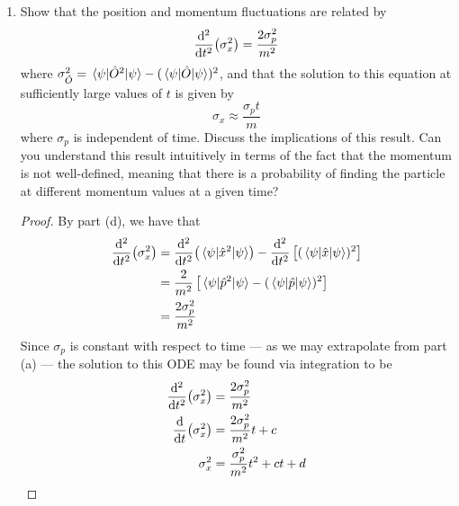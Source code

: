 \documentclass[../psets.tex]{subfiles}
\begin{document}
\begin{enumerate}
\begin{enumerate}
\begin{proof}
\begin{align*}
                &= 2\dv{t}(\ev{\hat{x}}{\psi})\cdot\dv{t}(\ev{\hat{x}}{\psi})+2\ev{\hat{x}}{\psi}\cdot\dv[2]{t}(\ev{\hat{x}}{\psi})\\
                &= \frac{2p_0^2}{m^2}+2x_0\cdot\underbrace{\dv{t}(\frac{p_0}{m})}_0\\
                \Aboxed{\dv[2]{t}\left[ (\ev{\hat{x}}{\psi})^2 \right] &= \frac{2}{m^2}(\ev{\hat{p}}{\psi})^2}
            \end{align*}
        \end{proof}
        \item Show that the position and momentum fluctuations are related by
        \begin{equation}
            \dv[2]{t}(\sigma_x^2) = \frac{2\sigma_p^2}{m^2}
        \end{equation}
        where $\sigma_{\hat{O}}^2=\ev{\hat{O}^2}{\psi}-(\ev{\hat{O}}{\psi})^2$, and that the solution to this equation at sufficiently large values of $t$ is given by
        \begin{equation}\label{eqn:4.6}
            \sigma_x \approx \frac{\sigma_pt}{m}
        \end{equation}
        where $\sigma_p$ is independent of time. Discuss the implications of this result. Can you understand this result intuitively in terms of the fact that the momentum is not well-defined, meaning that there is a probability of finding the particle at different momentum values at a given time?
        \begin{proof}
            By part (d), we have that
            \begin{align*}
                \dv[2]{t}(\sigma_x^2) &= \dv[2]{t}(\ev{\hat{x}^2}{\psi})-\dv[2]{t}\left[ (\ev{\hat{x}}{\psi})^2 \right]\\
                &= \frac{2}{m^2}\left[ \ev{\hat{p}^2}{\psi}-(\ev{\hat{p}}{\psi})^2 \right]\\
                &= \frac{2\sigma_p^2}{m^2}
            \end{align*}
            Since $\sigma_p$ is constant with respect to time --- as we may extrapolate from part (a) --- the solution to this ODE may be found via integration to be
            \begin{align*}
                \dv[2]{t}(\sigma_x^2) &= \frac{2\sigma_p^2}{m^2}\\
                \dv{t}(\sigma_x^2) &= \frac{2\sigma_p^2}{m^2}t+c\\
                \sigma_x^2 &= \frac{\sigma_p^2}{m^2}t^2+ct+d
            \end{align*}

\end{proof}
\end{enumerate}
\end{enumerate}
\end{document}
